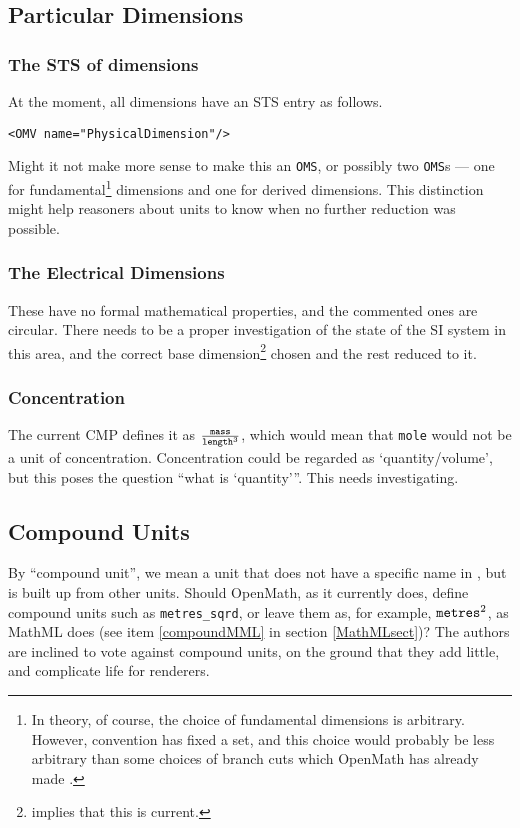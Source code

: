 \documentclass[11pt]{openmathTN}
\def\action#1{\hfill\rlap{\bf #1}}
\begin{document}
\subsection{Particular Dimensions}
\subsubsection{The STS of dimensions}
At the moment, all dimensions have an STS entry as follows.
\begin{verbatim}
<OMV name="PhysicalDimension"/>
\end{verbatim}
Might it not make more sense to make this an {\tt OMS}, or possibly two
{\tt OMS}s --- one for fundamental\footnote{In theory, of course, the
choice of fundamental dimensions is arbitrary. However, convention has
fixed a set, and this choice would probably be less arbitrary than some
choices of branch cuts which OpenMath has already made
\cite{Corlessetal2000}.} dimensions and one for derived dimensions. This
distinction might help reasoners about units to know when no further
reduction was possible.
\subsubsection{The Electrical Dimensions}
These have no formal mathematical properties, and the commented ones are
circular. There needs to be a proper investigation of the state of the SI
system \cite{IEEEASTM1997} in this area, and the correct base
dimension\footnote{\cite[section 6.1]{WorldWideWebConsortium2003} implies
that this is current.} chosen and the rest reduced to it.\action{JHD}
\subsubsection{Concentration}
The current CMP defines it as $\frac{{\tt mass}}{{\tt length}^3}$, which
would mean that {\tt mole} would not be a unit of concentration.
Concentration could be regarded as `quantity/volume', but this poses the
question ``what is {`quantity'}''. This needs investigating.\action{JHD?}
\subsection{Compound Units}\label{compoundOM}
By ``compound unit'', we mean a unit that does not have a specific name in
\cite{IEEEASTM1997}, but is built up from other units. 
Should OpenMath, as it currently does, define compound units such as
\verb+metres_+\allowbreak\verb+sqrd+, or leave them as, for example, ${\tt
metres}^2$, as MathML does (see item \ref{compoundMML} in section
\ref{MathMLsect})? The authors are inclined to vote against compound units,
on the ground that they add little, and complicate life for renderers.
\end{document}
